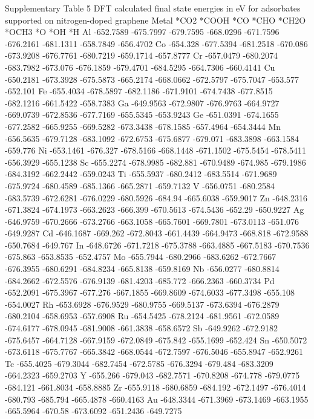Supplementary Table 5
DFT calculated final state energies in eV for adsorbates supported on nitrogen-doped graphene
Metal	*CO2	*COOH	*CO	*CHO	*CH2O	*OCH3	*O	*OH	*H
Al	-652.7589	-675.7997	-679.7595	-668.0296	-671.7596	-676.2161	-681.1311	-658.7849	-656.4702
Co	-654.328	-677.5394	-681.2518	-670.086	-673.9208	-676.7761	-680.7219	-659.1714	-657.8777
Cr	-657.0479	-680.2074	-683.7982	-673.076	-676.1859	-679.4701	-684.5295	-664.7306	-660.4141
Cu	-650.2181	-673.3928	-675.5873	-665.2174	-668.0662	-672.5797	-675.7047	-653.577	-652.101
Fe	-655.4034	-678.5897	-682.1186	-671.9101	-674.7438	-677.8515	-682.1216	-661.5422	-658.7383
Ga	-649.9563	-672.9807	-676.9763	-664.9727	-669.0739	-672.8536	-677.7169	-655.5345	-653.9243
Ge	-651.0391	-674.1655	-677.2582	-665.9255	-669.5282	-673.3438	-678.1585	-657.4964	-654.3444
Mn	-656.5635	-679.7128	-683.1092	-672.6753	-675.6877	-679.071	-683.3898	-663.1584	-659.776
Ni	-653.1461	-676.327	-678.5166	-668.1448	-671.1502	-675.5454	-678.5411	-656.3929	-655.1238
Sc	-655.2274	-678.9985	-682.881	-670.9489	-674.985	-679.1986	-684.3192	-662.2442	-659.0243
Ti	-655.5937	-680.2412	-683.5514	-671.9689	-675.9724	-680.4589	-685.1366	-665.2871	-659.7132
V	-656.0751	-680.2584	-683.5739	-672.6281	-676.0229	-680.5926	-684.94	-665.6038	-659.9017
Zn	-648.2316	-671.3824	-674.1973	-663.2623	-666.399	-670.5613	-674.5436	-652.29	-650.9227
Ag	-646.9759	-670.2666	-673.2766	-663.1058	-665.7601	-669.7801	-673.0113	-651.076	-649.9287
Cd	-646.1687	-669.262	-672.8043	-661.4439	-664.9473	-668.818	-672.9588	-650.7684	-649.767
In	-648.6726	-671.7218	-675.3788	-663.4885	-667.5183	-670.7536	-675.863	-653.8535	-652.4757
Mo	-655.7944	-680.2966	-683.6262	-672.7667	-676.3955	-680.6291	-684.8234	-665.8138	-659.8169
Nb	-656.0277	-680.8814	-684.2662	-672.5576	-676.9139	-681.4203	-685.772	-666.2363	-660.3734
Pd	-652.2091	-675.3967	-677.276	-667.1855	-669.8609	-674.6033	-677.3498	-655.108	-654.0027
Rh	-653.6928	-676.9529	-680.9755	-669.5137	-673.6394	-676.2879	-680.2104	-658.6953	-657.6908
Ru	-654.5425	-678.2124	-681.9561	-672.0589	-674.6177	-678.0945	-681.9008	-661.3838	-658.6572
Sb	-649.9262	-672.9182	-675.6457	-664.7128	-667.9159	-672.0849	-675.842	-655.1699	-652.424
Sn	-650.5072	-673.6118	-675.7767	-665.3842	-668.0544	-672.7597	-676.5046	-655.8947	-652.9261
Tc	-655.4025	-679.3044	-682.7454	-672.5785	-676.3294	-679.484	-683.3209	-664.2323	-659.2703
Y	-655.266	-679.043	-682.7571	-670.8208	-674.778	-679.0775	-684.121	-661.8034	-658.8885
Zr	-655.9118	-680.6859	-684.192	-672.1497	-676.4014	-680.793	-685.794	-665.4878	-660.4163
Au	-648.3344	-671.3969	-673.1469	-663.1955	-665.5964	-670.58	-673.6092	-651.2436	-649.7275
